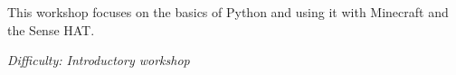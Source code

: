 %
%
%

\newif\ifprint
\printfalse



\newcommand{\workshopTitle}{Workshop 14: Python}

\newcommand{\workshopAuthor}{CREATIVE PI}



	

	This workshop focuses on the basics of Python and using it with Minecraft and the Sense HAT.

	\textit{Difficulty: Introductory workshop}

	\ifprint
		\renewcommand{\baselinestretch}{0.75}\normalsize
		\tableofcontents
		\renewcommand{\baselinestretch}{1.0}\normalsize
	\else
		\tableofcontents
	\fi


	
		\clearpage

	
		\webclearpage

	
		\webclearpage

	
		\webclearpage

	
		\webclearpage



